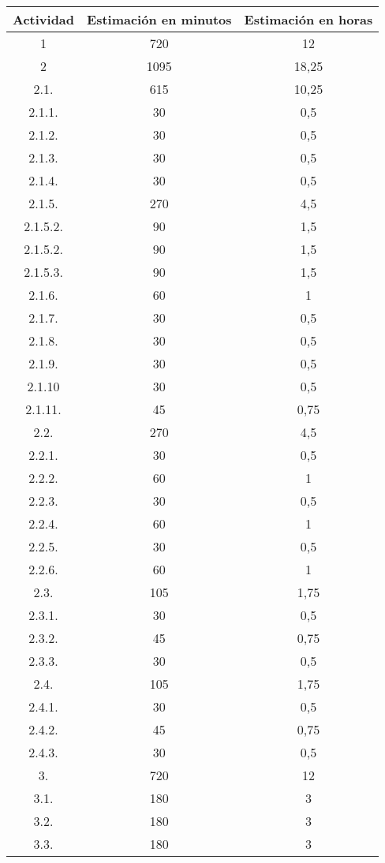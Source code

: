 \begin{longtable}{|c|c|c|}
\hline
\textbf{Actividad} & \textbf{Estimación en minutos} & \textbf{Estimación en horas} \\ \hline
1 & 720 & 12 \\ \hline
2 & 1095 & 18,25 \\ \hline
2.1. & 615 & 10,25 \\ \hline
2.1.1. & 30 & 0,5 \\ \hline
2.1.2. & 30 & 0,5 \\ \hline
2.1.3. & 30 & 0,5 \\ \hline
2.1.4. & 30 & 0,5 \\ \hline
2.1.5. & 270 & 4,5 \\ \hline
2.1.5.2. & 90 & 1,5 \\ \hline
2.1.5.2. & 90 & 1,5 \\ \hline
2.1.5.3. & 90 & 1,5 \\ \hline
2.1.6. & 60 & 1 \\ \hline
2.1.7. & 30 & 0,5 \\ \hline
2.1.8. & 30 & 0,5 \\ \hline
2.1.9. & 30 & 0,5 \\ \hline
2.1.10 & 30 & 0,5 \\ \hline
2.1.11. & 45 & 0,75 \\ \hline
2.2. & 270 & 4,5 \\ \hline
2.2.1. & 30 & 0,5 \\ \hline
2.2.2. & 60 & 1 \\ \hline
2.2.3. & 30 & 0,5 \\ \hline
2.2.4. & 60 & 1 \\ \hline
2.2.5. & 30 & 0,5 \\ \hline
2.2.6. & 60 & 1 \\ \hline
2.3. & 105 & 1,75 \\ \hline
2.3.1. & 30 & 0,5 \\ \hline
2.3.2. & 45 & 0,75 \\ \hline
2.3.3. & 30 & 0,5 \\ \hline
2.4. & 105 & 1,75 \\ \hline
2.4.1. & 30 & 0,5 \\ \hline
2.4.2. & 45 & 0,75 \\ \hline
2.4.3. & 30 & 0,5 \\ \hline
3. & 720 & 12 \\ \hline
3.1. & 180 & 3 \\ \hline
3.2. & 180 & 3 \\ \hline
3.3. & 180 & 3 \\ \hline

\end{longtable}
